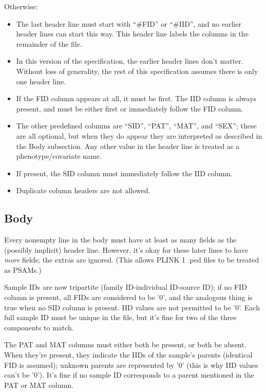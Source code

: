 \documentclass[8pt]{article}
\begin{document}
Otherwise:

\begin{itemize}
\item The last header line must start with ``\#FID'' or ``\#IID'', and no
  earlier header lines can start this way.  This header line labels the columns
  in the remainder of the file.
\item In this version of the specification, the earlier header lines don't
  matter.  Without loss of generality, the rest of this specification assumes
  there is only one header line.
\item If the FID column appears at all, it must be first.  The IID column is
  always present, and must be either first or immediately follow the FID
  column.
\item The other predefined columns are ``SID'', ``PAT'', ``MAT'', and ``SEX'';
  these are all optional, but when they do appear they are interpreted as
  described in the Body subsection.  Any other value in the header line is
  treated as a phenotype/covariate name.
\item If present, the SID column must immediately follow the IID column.
\item Duplicate column headers are not allowed.
\end{itemize}

\subsection{Body}

Every nonempty line in the body must have at least as many fields as the
(possibly implicit) header line.  However, it's okay for these later lines to
have \textit{more} fields; the extras are ignored.  (This allows PLINK 1 .ped
files to be treated as PSAMs.)

Sample IDs are now tripartite (family ID-individual ID-source ID); if no FID
column is present, all FIDs are considered to be '0', and the analogous thing
is true when no SID column is present.  IID values are not permitted to be '0'.
Each full sample ID must be unique in the file, but it's fine for two of the
three components to match.

The PAT and MAT columns must either both be present, or both be absent.  When
they're present, they indicate the IIDs of the sample's parents (identical FID
is assumed); unknown parents are represented by '0' (this is why IID values
can't be '0').  It's fine if no sample ID corresponds to a parent mentioned in
the PAT or MAT column.
\end{document}
